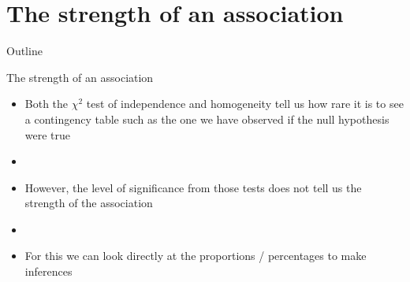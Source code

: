 \documentclass[xcolor=dvipsnames]{beamer}
\begin{document}
\section{The strength of an association}
\begin{frame}{Outline}
\tableofcontents[currentsection,subsectionstyle=show/shaded/hide]
\end{frame}

\begin{frame}{The strength of an association}
	\begin{itemize}
		\item Both the $\chi^2$ test of independence and homogeneity tell us how rare it is to see a contingency table such as the one we have observed if the null hypothesis were true \pause
		\item[]
		\item However, the level of significance from those tests does not tell us the strength of the association \pause
		\item[]
		\item For this we can look directly at the proportions / percentages to make inferences \pause
	\end{itemize}
\end{frame}
\end{document}
